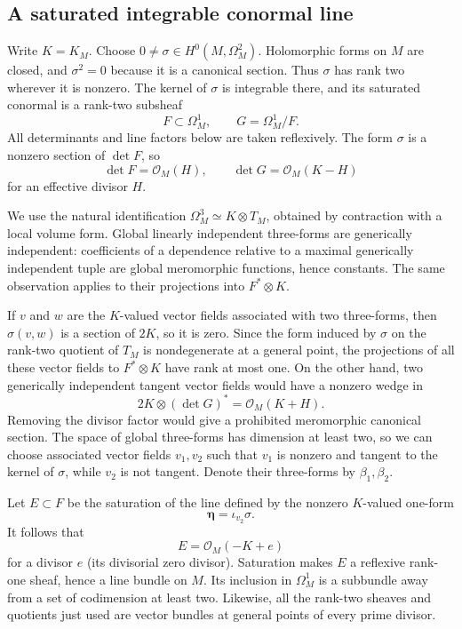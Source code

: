 \documentclass[11pt,letterpaper]{article}
\newcommand{\OO}{\mathcal{O}}
\theoremstyle{definition}
\theoremstyle{remark}
\begin{document}
\subsection{A saturated integrable conormal line}

Write $K=K_M$.  Choose $0\ne\sigma\in H^0(M,\Omega_M^2)$.  Holomorphic
forms on $M$ are closed, and $\sigma^2=0$ because it is a canonical
section.  Thus $\sigma$ has rank two wherever it is nonzero.  The kernel
of $\sigma$ is integrable there, and its saturated conormal is a rank-two
subsheaf
\[
 F\subset\Omega_M^1,\qquad G=\Omega_M^1/F.
\]
All determinants and line factors below are taken reflexively.  The form
$\sigma$ is a nonzero section of $\det F$, so
\begin{equation}\label{fol:F-and-G}
 \det F=\OO_M(H),\qquad \det G=\OO_M(K-H)
\end{equation}
for an effective divisor $H$.

We use the natural identification
$\Omega_M^3\simeq K\otimes T_M$, obtained by contraction with a local
volume form.  Global linearly independent three-forms are generically
independent: coefficients of a dependence relative to a maximal
generically independent tuple are global meromorphic functions, hence
constants.  The same observation applies to their projections into
$F^*\otimes K$.

If $v$ and $w$ are the $K$-valued vector fields associated with two
three-forms, then $\sigma(v,w)$ is a section of $2K$, so it is zero.
Since the form induced by $\sigma$ on the rank-two quotient of $T_M$ is
nondegenerate at a general point, the projections of all these vector
fields to $F^*\otimes K$ have rank at most one.  On the other hand, two
generically independent tangent vector fields would have a nonzero
wedge in
\[
 2K\otimes(\det G)^*=\OO_M(K+H).
\]
Removing the divisor factor would give a prohibited meromorphic
canonical section.  The space of global three-forms has dimension at
least two, so we can choose associated vector fields $v_1,v_2$ such that
$v_1$ is nonzero and tangent to the kernel of $\sigma$, while $v_2$ is
not tangent.  Denote their three-forms by $\beta_1,\beta_2$.

Let $E\subset F$ be the saturation of the line defined by the nonzero
$K$-valued one-form
\[
 \boldsymbol\eta=\iota_{v_2}\sigma.
\]
It follows that
\begin{equation}\label{fol:E-class}
 E=\OO_M(-K+e)
\end{equation}
for a divisor $e$ (its divisorial zero divisor).  Saturation makes $E$ a
reflexive rank-one sheaf, hence a line bundle on $M$.  Its inclusion in
$\Omega_M^1$ is a subbundle away from a set of codimension at least two.
Likewise, all the rank-two sheaves and quotients just used are vector
bundles at general points of every prime divisor.
\end{document}
